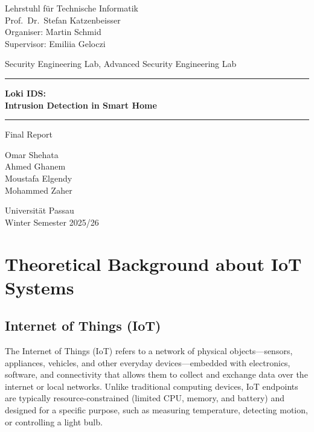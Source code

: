 \documentclass[12pt,a4paper]{article}
\begin{document}
\begin{titlepage}
    \centering
    \vspace*{2cm}

    {\large Lehrstuhl f\"ur Technische Informatik\\
    Prof.\ Dr.\ Stefan Katzenbeisser\\[4pt]
    Organiser: Martin Schmid\\
    Supervisor: Emiliia Geloczi}

    \vspace{1.5cm}
    {\large Security Engineering Lab, Advanced Security Engineering Lab}

    \vspace{1cm}
    \rule{\textwidth}{1pt}
    \vspace{0.5cm}

    {\Huge \textbf{Loki IDS:\\Intrusion Detection in Smart Home}}

    \vspace{0.5cm}
    \rule{\textwidth}{1pt}

    \vspace{2cm}
    {\large Final Report}

    \vspace{1.5cm}
    {\large
    Omar Shehata \\
    Ahmed Ghanem \\
    Moustafa Elgendy \\
    Mohammed Zaher}

    \vfill
    {\large Universit\"at Passau \\ Winter Semester 2025/26}
\end{titlepage}

\newpage
\tableofcontents
\newpage

\section{Theoretical Background about IoT Systems}
\label{sec:theory}

\subsection{Internet of Things (IoT)}
\label{sec:iot}

The Internet of Things (IoT) refers to a network of physical objects---sensors, appliances, vehicles, and other everyday devices---embedded with electronics, software, and connectivity that allows them to collect and exchange data over the internet or local networks. Unlike traditional computing devices, IoT endpoints are typically resource-constrained (limited CPU, memory, and battery) and designed for a specific purpose, such as measuring temperature, detecting motion, or controlling a light bulb.
\end{document}
